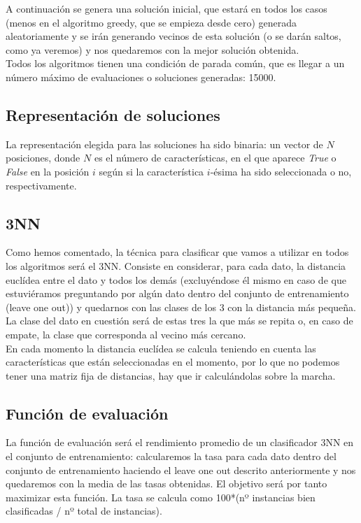 \documentclass[12pt]{article}
\begin{document}
A continuación se genera una solución inicial, que estará en todos los casos (menos en el algoritmo greedy, que se empieza desde cero) generada aleatoriamente y se irán generando vecinos de esta solución (o se darán saltos, como ya veremos) y nos quedaremos con la mejor solución obtenida.\\

Todos los algoritmos tienen una condición de parada común, que es llegar a un número máximo de evaluaciones o soluciones generadas: 15000.

\subsection{Representación de soluciones}
La representación elegida para las soluciones ha sido binaria: un vector de $N$ posiciones, donde $N$ es el número de características, en el que aparece \textit{True} o \textit{False} en la posición $i$ según si la característica $i$-ésima ha sido seleccionada o no, respectivamente.

\subsection{3NN}
Como hemos comentado, la técnica para clasificar que vamos a utilizar en todos los algoritmos será el 3NN. Consiste en considerar, para cada dato, la distancia euclídea entre el dato y todos los demás (excluyéndose él mismo en caso de que estuviéramos preguntando por algún dato dentro del conjunto de entrenamiento (leave one out)) y quedarnos con las clases de los 3 con la distancia más pequeña. La clase del dato en cuestión será de estas tres la que más se repita o, en caso de empate, la clase que corresponda al vecino más cercano.\\
En cada momento la distancia euclídea se calcula teniendo en cuenta las características que están seleccionadas en el momento, por lo que no podemos tener una matriz fija de distancias, hay que ir calculándolas sobre la marcha.

\subsection{Función de evaluación}
La función de evaluación será el rendimiento promedio de un clasificador 3NN en el conjunto de entrenamiento: calcularemos la tasa para cada dato dentro del conjunto de entrenamiento haciendo el leave one out descrito anteriormente y nos quedaremos con la media de las tasas obtenidas. El objetivo será por tanto maximizar esta función.
La tasa se calcula como 100*(nº instancias bien clasificadas / nº total de instancias).\\
\end{document}
